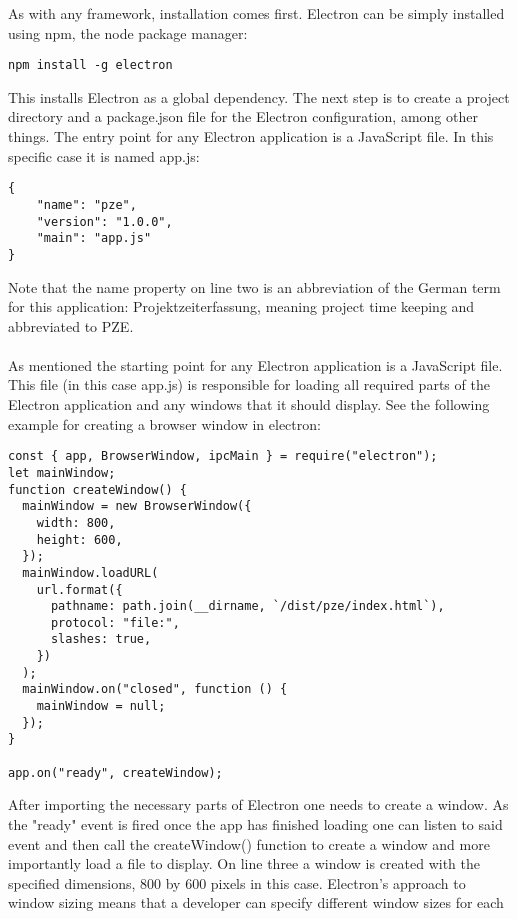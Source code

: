 
As with any framework, installation comes first.
Electron can be simply installed using npm, the node package manager: \parencite{npm}
\begin{lstlisting}[caption=Installing Electron via npm]
    npm install -g electron
\end{lstlisting}
This installs Electron as a global dependency. 
The next step is to create a project directory and a package.json file for the Electron configuration, among other things. 
The entry point for any Electron application is a JavaScript file. 
In this specific case it is named app.js:
\begin{lstlisting}[caption=Minimal package.json for an Electron application]
{
    "name": "pze",
    "version": "1.0.0",
    "main": "app.js"
}
\end{lstlisting}
Note that the name property on line two is an abbreviation of the German term for this application:
Projektzeiterfassung, meaning project time keeping and abbreviated to PZE.\paragraph{}
As mentioned the starting point for any Electron application is a JavaScript file. 
This file (in this case app.js) is responsible for loading all required parts of the Electron application 
and any windows that it should display.
See the following example for creating a browser window in electron:
\begin{lstlisting}[caption=Creating a window in Electron on ready event]
const { app, BrowserWindow, ipcMain } = require("electron");
let mainWindow;
function createWindow() {
  mainWindow = new BrowserWindow({
    width: 800,
    height: 600,
  });
  mainWindow.loadURL(
    url.format({
      pathname: path.join(__dirname, `/dist/pze/index.html`),
      protocol: "file:",
      slashes: true,
    })
  );
  mainWindow.on("closed", function () {
    mainWindow = null;
  });
}

app.on("ready", createWindow);
\end{lstlisting}
After importing the necessary parts of Electron one needs to create a window. 
As the "ready" event is fired once the app has finished loading one can listen to said event
and then call the createWindow() function to create a window and more importantly load a file to display.
On line three a window is created with the specified dimensions, 800 by 600 pixels in this case. 
Electron's approach to window sizing means that a developer can specify different window sizes for each
